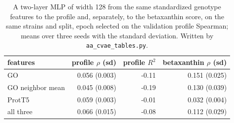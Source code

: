 \begin{table}[H]
  \centering
  \footnotesize
  \caption[The plain MLP from the same genotype features, no latent]{A two-layer MLP of width 128 from the same standardized genotype features to the profile and, separately, to the betaxanthin score, on the same strains and split, epoch selected on the validation profile Spearman; means over three seeds with the standard deviation. Written by \texttt{aa\_cvae\_tables.py}.}
  \label{tab:aa-cvae-baselines}
  \begin{tabular}{@{}lrrr@{}}
    \hline
    features & profile $\rho$ (sd) & profile $R^2$ & betaxanthin $\rho$ (sd) \\
    \hline
    GO & 0.056 (0.003) & -0.11 & 0.151 (0.025) \\
    GO neighbor mean & 0.045 (0.008) & -0.19 & 0.130 (0.039) \\
    ProtT5 & 0.059 (0.003) & -0.01 & 0.032 (0.004) \\
    all three & 0.066 (0.015) & -0.08 & 0.112 (0.029) \\
    \hline
  \end{tabular}
\end{table}
